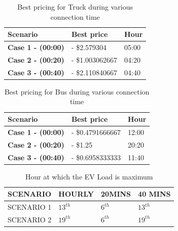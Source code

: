 		\begin{table}[h]
			\centering
			\begin{tabular}{|l|l|l|}
				\hline
				\textbf{Scenario}         & \textbf{Best price} & \textbf{Hour} \\ \hline
				\textbf{Case 1 - (00:00)}  & - \$2.579304 & 05:00         \\ \hline
				\textbf{Case 2 - (00:20)} & - \$1.003062667 & 04:20         \\ \hline
				\textbf{Case 3 - (00:40)} & - \$2.110840667 & 04:40         \\ \hline
			\end{tabular}
			\caption{Best pricing for Truck during various connection time}
		\end{table}



		\begin{table}[h]
			\centering
			\begin{tabular}{|l|l|l|}
				\hline
				\textbf{Scenario}         & \textbf{Best price} & \textbf{Hour} \\ \hline
				\textbf{Case 1 - (00:00)}  & - \$0.4791666667   & 12:00         \\ \hline
				\textbf{Case 2 - (00:20)} & - \$1.25         & 20:20         \\ \hline
				\textbf{Case 3 - (00:40)} & - \$0.6958333333 & 11:40         \\ \hline
			\end{tabular}
			\caption{Best pricing for Bus during various connection time}
		\end{table}

	\begin{table}[h]
		\centering
		\caption{Hour at which the EV Load is maximum }
		\begin{tabular}{|ll|ll|ll|ll|}
			\hline
			\multicolumn{2}{|l|}{\textbf{SCENARIO}} & \multicolumn{2}{l|}{\textbf{HOURLY}} & \multicolumn{2}{l|}{\textbf{20MINS}} & \multicolumn{2}{l|}{\textbf{40 MINS}} \\ \hline
			\multicolumn{2}{|l|}{SCENARIO 1}        & \multicolumn{2}{l|}{$ 13^{th} $}            & \multicolumn{2}{l|}{$ 6^{th} $}             & \multicolumn{2}{l|}{$ 13^{th} $}             \\ \hline
			\multicolumn{2}{|l|}{SCENARIO 2}        & \multicolumn{2}{l|}{$ 19^{th} $}           & \multicolumn{2}{l|}{$ 6^{th} $}             & \multicolumn{2}{l|}{$ 19^{th} $}             \\ \hline
		\end{tabular}
	\end{table}
		

